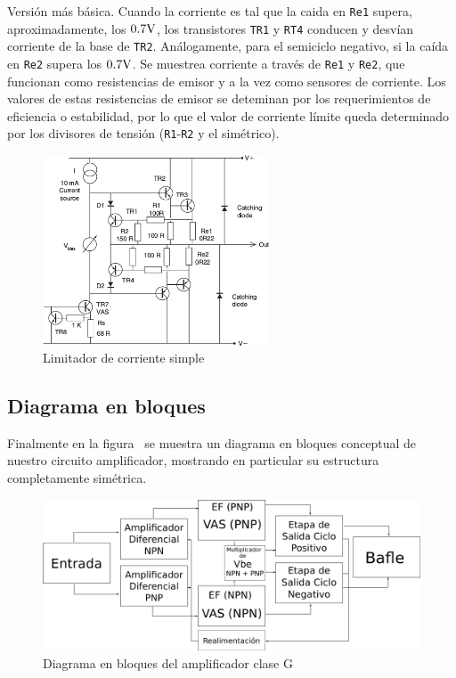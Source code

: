 Versión más básica. Cuando la corriente es tal que la caida en \texttt{Re1} supera, aproximadamente, los $0.7 \si[per-mode=symbol]{\volt}$, los transistores \texttt{TR1} y \texttt{RT4} conducen y desvían corriente de la base de \texttt{TR2}. Análogamente, para el semiciclo negativo, si la caída en \texttt{Re2} supera los $0.7 \si[per-mode=symbol]{\volt}$. Se muestrea corriente a través de \texttt{Re1} y \texttt{Re2}, que funcionan como resistencias de emisor y a la vez como sensores de corriente. Los valores de estas resistencias de emisor se deteminan por los requerimientos de eficiencia o estabilidad, por lo que el valor de corriente límite queda determinado por los divisores de tensión (\texttt{R1}-\texttt{R2} y el simétrico). 


\begin{figure}[H]
	\centering
	\includegraphics[width=0.6\textwidth]{img/simple-current-limit.png}
	\caption{Limitador de corriente simple}
	\label{fig:simple-current-limit}
\end{figure}



\subsection{Diagrama en bloques}

Finalmente en la figura~ se muestra un diagrama en bloques conceptual de nuestro circuito amplificador, mostrando en particular su estructura completamente simétrica.

\clearpage


\begin{figure}[H]
	\centering
	\includegraphics[width=0.9\paperwidth, angle=90]{img/bloques.png}
	\caption{Diagrama en bloques del amplificador clase G}
	\label{fig:ampli_bloques}
\end{figure}